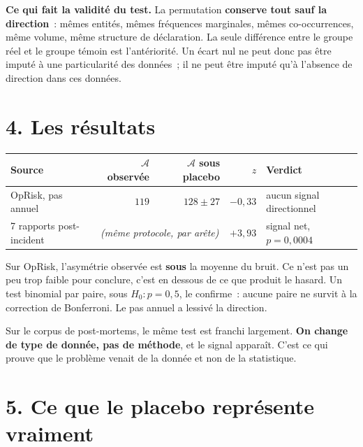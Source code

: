\documentclass[11pt,a4paper]{article}
\begin{document}
\begin{cle}
\textbf{Ce qui fait la validité du test.} La permutation \textbf{conserve tout sauf la
direction}~: mêmes entités, mêmes fréquences marginales, mêmes co-occurrences, même volume,
même structure de déclaration. La seule différence entre le groupe réel et le groupe témoin
est l'antériorité. Un écart nul ne peut donc pas être imputé à une particularité des
données~; il ne peut être imputé qu'à l'absence de direction dans ces données.
\end{cle}

\section*{4. Les résultats}

\begin{center}
\small
\begin{tabular}{@{}l r r r l@{}}
\toprule
\textbf{Source} & \textbf{$\mathcal{A}$ observée} & \textbf{$\mathcal{A}$ sous placebo} &
\textbf{$z$} & \textbf{Verdict} \\
\midrule
OpRisk, pas annuel & $119$ & $128 \pm 27$ & $-0{,}33$ & aucun signal directionnel \\
7 rapports post-incident & \multicolumn{2}{c}{\emph{(même protocole, par arête)}} &
$+3{,}93$ & signal net, $p=0{,}0004$ \\
\bottomrule
\end{tabular}
\end{center}

\medskip
Sur OpRisk, l'asymétrie observée est \textbf{sous} la moyenne du bruit. Ce n'est pas
\og un peu trop faible pour conclure\fg, c'est en dessous de ce que produit le hasard.
Un test binomial par paire, sous $H_0: p=0{,}5$, le confirme~: aucune paire ne survit à la
correction de Bonferroni. Le pas annuel a lessivé la direction.

Sur le corpus de post-mortems, le même test est franchi largement. \textbf{On change de
type de donnée, pas de méthode}, et le signal apparaît. C'est ce qui prouve que le problème
venait de la donnée et non de la statistique.

\section*{5. Ce que le placebo représente vraiment}
\end{document}

